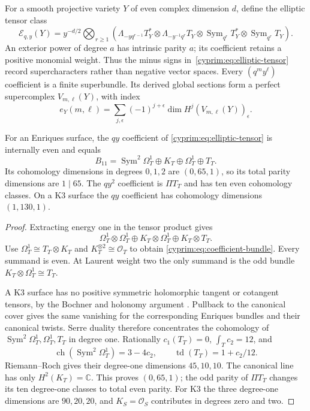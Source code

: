 For a smooth projective variety $Y$ of even complex dimension
$d$, define the elliptic tensor class
\begin{equation}\label{cyprim:eq:elliptic-tensor}
 \mathcal E_{q,y}(Y)=y^{-d/2}\bigotimes_{r\ge1}
 \left(\Lambda_{-yq^{r-1}}T_Y^*
 \otimes\Lambda_{-y^{-1}q^r}T_Y
 \otimes\operatorname{Sym}_{q^r}T_Y^*
 \otimes\operatorname{Sym}_{q^r}T_Y\right).
\end{equation}
An exterior power of degree $a$ has intrinsic parity $a$;
its coefficient retains a positive monomial weight. Thus
the minus signs in~\eqref{cyprim:eq:elliptic-tensor} record
supercharacters rather than negative vector spaces.
Every $(q^my^\ell)$ coefficient is a finite superbundle.
Its derived global sections form a perfect supercomplex
$V_{m,\ell}(Y)$, with index
\[
 e_Y(m,\ell)=\sum_{j,\epsilon}(-1)^{j+\epsilon}
                       \dim H^j(V_{m,\ell}(Y))_\epsilon.
\]

\begin{proposition}\label{cyprim:prop:elliptic-coefficient}
For an Enriques surface, the $qy$ coefficient of
\eqref{cyprim:eq:elliptic-tensor} is internally even and equals
\begin{equation}\label{cyprim:eq:coefficient-bundle}
 B_{11}=\operatorname{Sym}^2\Omega_T^1\oplus K_T
                      \oplus\Omega_T^1\oplus T_T.
\end{equation}
Its cohomology dimensions in degrees $0,1,2$ are $(0,65,1)$,
so its total parity dimensions are $1\mid65$. The $qy^2$
coefficient is $\Pi T_T$ and has ten even cohomology classes.
On a K3 surface the $qy$ coefficient has cohomology
dimensions $(1,130,1)$.
\end{proposition}

\begin{proof}
Extracting energy one in the tensor product gives
\[
 \Omega_T^1\otimes\Omega_T^1
   \oplus K_T\otimes\Omega_T^1\oplus K_T\otimes T_T.
\]
Use $\Omega_T^1\cong T_T\otimes K_T$ and
$K_T^{\otimes2}\cong\mathcal O_T$ to obtain
\eqref{cyprim:eq:coefficient-bundle}. Every summand is even.
At Laurent weight two the only summand is the odd bundle
$K_T\otimes\Omega_T^1\cong T_T$.

A K3 surface has no positive symmetric holomorphic tangent
or cotangent tensors, by the Bochner and holonomy argument
\cite[Corollary~8]{rewriteKob1980}. Pullback to the canonical
cover gives the same vanishing for the corresponding Enriques
bundles and their canonical twists. Serre duality therefore
concentrates the cohomology of
$\operatorname{Sym}^2\Omega_T^1,\Omega_T^1,T_T$ in degree one.
Rationally $c_1(T_T)=0$, $\int_Tc_2=12$, and
\[
 \operatorname{ch}(\operatorname{Sym}^2\Omega_T^1)=3-4c_2,
 \qquad \operatorname{td}(T_T)=1+c_2/12.
\]
Riemann--Roch gives their degree-one dimensions $45,10,10$.
The canonical line has only $H^2(K_T)=\mathbb C$.
This proves $(0,65,1)$; the odd parity of $\Pi T_T$ changes
its ten degree-one classes to total even parity.
For K3 the three degree-one dimensions are $90,20,20$,
and $K_S=\mathcal O_S$ contributes in degrees zero and two.
\end{proof}

